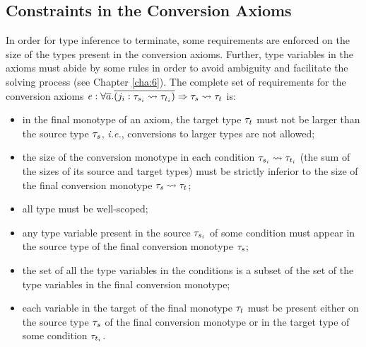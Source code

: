 \subsection{Constraints in the Conversion Axioms}
\label{constraints}
In order for type inference to terminate, some requirements are enforced on the size of the types present in the conversion axioms. Further, type variables in the axioms must abide by some rules in order to avoid ambiguity and facilitate the solving process (see Chapter \ref{cha:6}). The complete set of requirements for the conversion axioms $\mathit{e} : \forall \overline{a}.\overline{(j_i:\mathit{\tau}_{s_i} \rightsquigarrow \mathit{\tau}_{t_i})}\Rightarrow \mathit{\tau}_s \rightsquigarrow \mathit{\tau}_t$ is:
\begin{itemize}
\item in the final monotype of an axiom, the target type $\mathit{\tau}_t$ must not be larger than the source type $\mathit{\tau}_s$, \textit{i.e.}, conversions to larger types are not allowed;
\item the size of the conversion monotype in each condition $\mathit{\tau}_{s_i} \rightsquigarrow \mathit{\tau}_{t_i}$ (the sum of the sizes of its source and target types) must be strictly inferior to the size of the final conversion monotype $\mathit{\tau}_{s} \rightsquigarrow \mathit{\tau}_{t}$;
\item all type must be well-scoped;
\item any type variable present in the source $\mathit{\tau}_{s_i}$ of some condition must appear in the source type of the final conversion monotype $\mathit{\tau}_s$;
\item the set of all the type variables in the conditions is a subset of the set of the type variables in the final conversion monotype;
  \item each variable in the target of the final monotype $\mathit{\tau}_t$ must be present either on the source type $\mathit{\tau}_s$ of the final conversion monotype or in the target type of some condition $\mathit{\tau}_{t_i}$.
\end{itemize}

